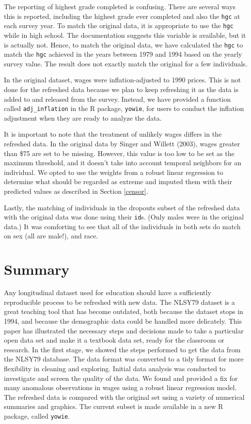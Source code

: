 \documentclass{article}
\begin{document}
The reporting of highest grade completed is confusing. There are several ways this is reported, including the highest grade ever completed and also the \texttt{hgc} at each survey year. To match the original data, it is appropriate to use the \texttt{hgc} while in high school. The documentation suggests this variable is available, but it is actually not. Hence, to match the original data, we have calculated the \texttt{hgc} to match the \texttt{hgc} achieved in the years between 1979 and 1994 based on the yearly survey value. The result does not exactly match the original for a few individuals.

In the original dataset, wages were inflation-adjusted to 1990 prices. This is not done for the refreshed data because we plan to keep refreshing it as the data is added to and released from the survey. Instead, we have provided a function called \texttt{adj\_inflation} in the R package, \texttt{yowie}, for users to conduct the inflation adjustment when they are ready to analyze the data.

It is important to note that the treatment of unlikely wages differs in the refreshed data. In the original data by Singer and Willett (2003), wages greater than \$75 are set to be missing. However, this value is too low to be set as the maximum threshold, and it doesn't take into account temporal neighbors for an individual. We opted to use the weights from a robust linear regression to determine what should be regarded as extreme and imputed them with their predicted values as described in Section \ref{censor}.

Lastly, the matching of individuals in the dropouts subset of the refreshed data with the original data was done using their \texttt{id}s. (Only males were in the original data.) It was comforting to see that all of the individuals in both sets do match on sex (all are male!), and race.

\hypertarget{summary}{%
\section{Summary}\label{summary}}

Any longitudinal dataset used for education should have a sufficiently reproducible process to be refreshed with new data. The NLSY79 dataset is a great teaching tool that has become outdated, both because the dataset stops in 1994, and because the demographic data could be handled more delicately. This paper has illustrated the necessary steps and decisions made to take a particular open data set and make it a textbook data set, ready for the classroom or research. In the first stage, we showed the steps performed to get the data from the NLSY79 database. The data format was converted to a tidy format for more flexibility in cleaning and exploring. Initial data analysis was conducted to investigate and screen the quality of the data. We found and provided a fix for many anomalous observations in wages using a robust linear regression model. The refreshed data is compared with the original set using a variety of numerical summaries and graphics. The current subset is made available in a new R package, called \texttt{yowie}.
\end{document}
